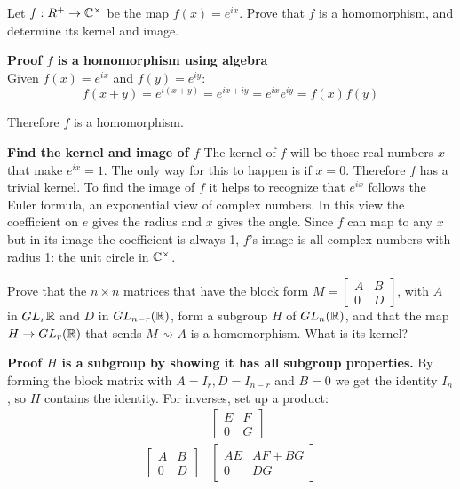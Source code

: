 \documentclass{article}
\begin{document}
\begin{problem}
Let $f: R^+ \to \mathbb{C}^\times$ be the map $f(x) = e^{ix}$. Prove that $f$ is a homomorphism, and determine its kernel and image.
\end{problem}

\textbf{Proof $f$ is a homomorphism using algebra}
\\

Given $f(x) = e^{ix}$ and $f(y) = e^{iy}$:
$$f(x+y) = e^{i(x+y)} = e^{ix + iy} = e^{ix}e^{iy} = f(x)f(y)$$

Therefore $f$ is a homomorphism.

\textbf{Find the kernel and image of $f$}
The kernel of $f$ will be those real numbers $x$ that make $e^{ix} = 1$. The only way for this to happen is if $x = 0$. Therefore $f$ has a trivial kernel. To find the image of $f$ it helps to recognize that $e^{ix}$ follows the Euler formula, an exponential view of complex numbers. In this view the coefficient on $e$ gives the radius and $x$ gives the angle. Since $f$ can map to any $x$ but in its image the coefficient is always 1, $f$'s image is all complex numbers with radius 1: the unit circle in $\mathbb{C}^\times$.

\begin{problem}
Prove that the $n \times n$ matrices that have the block form $M = \begin{bmatrix} A & B \\ 0 & D\end{bmatrix}$, with $A$ in $GL_r{\mathbb{R}}$ and $D$ in $GL_{n-r}(\mathbb{R})$, form a subgroup $H$ of $GL_n(\mathbb{R})$, and that the map $H \to GL_r(\mathbb{R})$ that sends $M \rightsquigarrow A$ is a homomorphism. What is its kernel?
\end{problem}

\textbf{Proof $H$ is a subgroup by showing it has all subgroup properties.}
By forming the block matrix with $A = I_r, D = I_{n-r}$ and $B = 0$ we get the identity $I_n$, so $H$ contains the identity. For inverses, set up a product:
\[
    \begin{array}{cc}
                                   & \begin{bmatrix} E & F \\ 0 & G \end{bmatrix} \\
        \begin{bmatrix} A & B \\ 0 & D \end{bmatrix} & \begin{bmatrix} AE & AF + BG \\ 0 & DG \end{bmatrix}
    \end{array}
\]
\end{document}
